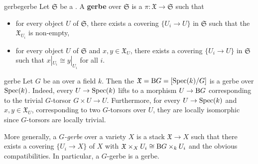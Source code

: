 \begin{topic}{gerbe}{gerbe}
    Let $\mathfrak{S}$ be a . A \textbf{gerbe} over $\mathfrak{S}$ is a  $\pi : \mathfrak{X} \to \mathfrak{S}$ such that
    \begin{itemize}
        \item for every object $U$ of $\mathfrak{S}$, there exists a covering $\{ U_i \to U \}$ in $\mathfrak{S}$ such that the  $\mathfrak{X}_{U_i}$ is non-empty,
        \item for every object $U$ of $\mathfrak{S}$ and $x, y \in \mathfrak{X}_U$, there exists a covering $\{ U_i \to U \}$ in $\mathfrak{S}$ such that $x|_{U_i} \cong y|_{U_i}$ for all $i$.
    \end{itemize}
\end{topic}

\begin{example}{gerbe}
    Let $G$ be an  over a field $k$. Then the  $\mathfrak{X} = \textup{B} G = [\operatorname{Spec}(k) / G]$ is a gerbe over $\operatorname{Spec}(k)$. Indeed, every $U \to \operatorname{Spec}(k)$ lifts to a morphism $U \to \textup{B} G$ corresponding to the trivial $G$-torsor $G \times U \to U$. Furthermore, for every $U \to \operatorname{Spec}(k)$ and $x, y \in \mathfrak{X}_{U}$, corresponding to two $G$-torsors over $U$, they are locally isomorphic since $G$-torsors are locally trivial.
    
    More generally, a \textit{$G$-gerbe} over a variety $X$ is a stack $\mathfrak{X} \to X$ such that there exists a covering $\{ U_i \to X \}$ of $X$ with $\mathfrak{X} \times_X U_i \cong \textup{B} G \times_k U_i$ and the obvious compatibilities. In particular, a $G$-gerbe is a gerbe.
\end{example}
